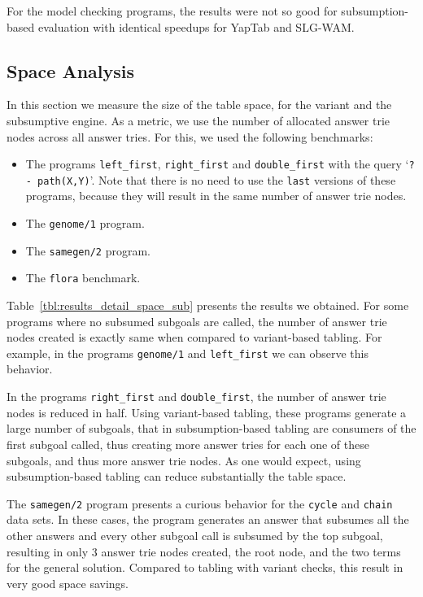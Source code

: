 For the model checking programs, the results were not so good for subsumption-based evaluation with
identical speedups for YapTab and SLG-WAM.




\subsection{Space Analysis}

In this section we measure the size of the table space, for the variant and the subsumptive engine.
As a metric, we use the number of allocated answer trie nodes across all answer tries.
For this, we used the following benchmarks:

\begin{itemize}
   \item The programs \texttt{left\_first}, \texttt{right\_first} and \texttt{double\_first} with the query `\texttt{?-~path(X,Y)}'. Note that there is no need to use
   the \texttt{last} versions of these programs, because they will result in the same number of answer trie nodes.
   
   \item The \texttt{genome/1} program.
   
   \item The \texttt{samegen/2} program.
   
   \item The \texttt{flora} benchmark.
\end{itemize}

Table~\ref{tbl:results_detail_space_sub} presents the results we obtained.  For some programs where
no subsumed subgoals are called, the number of answer trie nodes created is exactly same when compared
to variant-based tabling. For example, in the programs \texttt{genome/1} and \texttt{left\_first}
we can observe this behavior.

In the programs \texttt{right\_first} and \texttt{double\_first}, the number of answer trie nodes
is reduced in half. Using variant-based tabling, these programs generate a large number of subgoals,
that in subsumption-based tabling are consumers of the first subgoal called, thus creating more
answer tries for each one of these subgoals, and thus more answer trie nodes. As one would expect,
using subsumption-based tabling can reduce substantially the table space.

The \texttt{samegen/2} program presents a curious behavior for the \texttt{cycle} and \texttt{chain}
data sets. In these cases, the program generates an answer that subsumes all the other answers and
every other subgoal call is subsumed by the top subgoal, resulting in only 3 answer trie nodes created,
the root node, and the two terms for the general solution. Compared to tabling with variant checks, this
result in very good space savings.


